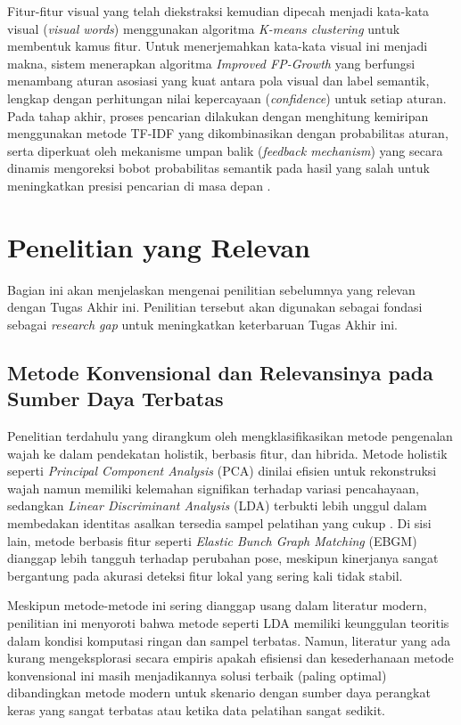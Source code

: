 Fitur-fitur visual yang telah diekstraksi kemudian dipecah menjadi kata-kata visual (\textit{visual words}) menggunakan algoritma \textit{K-means clustering} untuk membentuk kamus fitur. Untuk menerjemahkan kata-kata visual ini menjadi makna, sistem menerapkan algoritma \textit{Improved FP-Growth} yang berfungsi menambang aturan asosiasi yang kuat antara pola visual dan label semantik, lengkap dengan perhitungan nilai kepercayaan (\textit{confidence}) untuk setiap aturan. Pada tahap akhir, proses pencarian dilakukan dengan menghitung kemiripan menggunakan metode TF-IDF yang dikombinasikan dengan probabilitas aturan, serta diperkuat oleh mekanisme umpan balik (\textit{feedback mechanism}) yang secara dinamis mengoreksi bobot probabilitas semantik pada hasil yang salah untuk meningkatkan presisi pencarian di masa depan \autocite{LiJingwen2023}.

\section{Penelitian yang Relevan}

Bagian ini akan menjelaskan mengenai penilitian sebelumnya yang relevan dengan Tugas Akhir ini. Penilitian tersebut akan digunakan sebagai fondasi sebagai \textit{research gap} untuk meningkatkan keterbaruan Tugas Akhir ini.

\subsection{Metode Konvensional dan Relevansinya pada Sumber Daya Terbatas}

Penelitian terdahulu yang dirangkum oleh \textcite{Zhao2003} mengklasifikasikan metode pengenalan wajah ke dalam pendekatan holistik, berbasis fitur, dan hibrida. Metode holistik seperti \textit{Principal Component Analysis} (PCA) dinilai efisien untuk rekonstruksi wajah namun memiliki kelemahan signifikan terhadap variasi pencahayaan, sedangkan \textit{Linear Discriminant Analysis} (LDA) terbukti lebih unggul dalam membedakan identitas asalkan tersedia sampel pelatihan yang cukup . Di sisi lain, metode berbasis fitur seperti \textit{Elastic Bunch Graph Matching} (EBGM) dianggap lebih tangguh terhadap perubahan pose, meskipun kinerjanya sangat bergantung pada akurasi deteksi fitur lokal yang sering kali tidak stabil.

Meskipun metode-metode ini sering dianggap usang dalam literatur modern, penilitian ini menyoroti bahwa metode seperti LDA memiliki keunggulan teoritis dalam kondisi komputasi ringan dan sampel terbatas. Namun, literatur yang ada kurang mengeksplorasi secara empiris apakah efisiensi dan kesederhanaan metode konvensional ini masih menjadikannya solusi terbaik (paling optimal) dibandingkan metode modern untuk skenario dengan sumber daya perangkat keras yang sangat terbatas atau ketika data pelatihan sangat sedikit.

